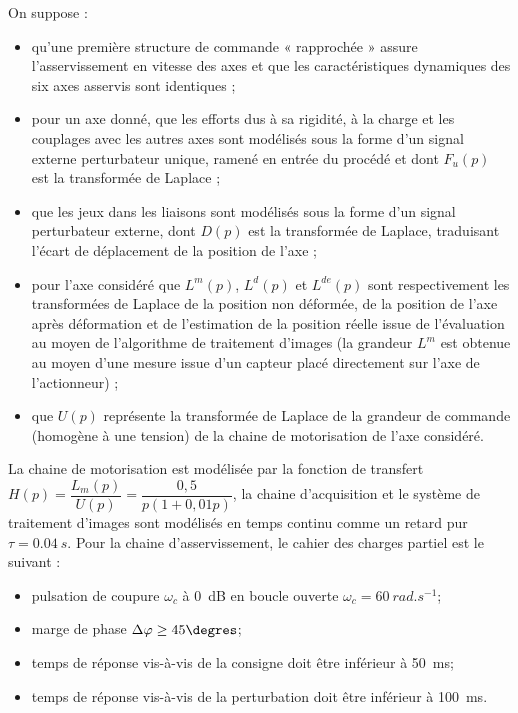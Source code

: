 \ifprof
\else
\ifcolle
\else
On suppose :
\begin{itemize}
\item qu’une première structure de commande « rapprochée » assure l’asservissement en vitesse des axes et que les caractéristiques dynamiques des six axes asservis sont identiques ;
\item pour un axe donné, que les efforts dus à sa rigidité, à la charge et les couplages avec les autres axes sont modélisés sous la forme d’un signal externe perturbateur unique, ramené en entrée du procédé et dont $F_u(p)$ est la transformée de Laplace ;
\item que les jeux dans les liaisons sont modélisés sous la forme d’un signal perturbateur externe, dont $D(p)$ est la transformée de Laplace, traduisant l’écart de déplacement de la position de l’axe ;
\item pour l’axe considéré que $L^m(p)$, $L^d(p)$ et $L^{de}(p)$ sont respectivement les transformées de Laplace de la position non déformée, de la position de l’axe après déformation et de l’estimation de la position réelle issue de l’évaluation au moyen de l’algorithme de traitement d’images (la grandeur $L^m$ est obtenue au moyen d’une mesure issue d’un capteur placé directement sur l’axe de l’actionneur) ;
\item que $U(p)$ représente la transformée de Laplace de la grandeur de commande (homogène à une tension) de la chaine de motorisation de l’axe considéré.
\end{itemize}
\fi


La chaine de motorisation est modélisée par la fonction de transfert $H(p)=\dfrac{L_m(p)}{U(p)}=\dfrac{0,5}{p\left( 1+0,01 p\right)}$, la chaine d'acquisition et le système de traitement d’images sont modélisés en temps continu comme un retard pur $\tau=\SI{0,04}{s}$.
Pour la chaine d’asservissement, le cahier des charges partiel est le suivant :
\begin{itemize}
\item pulsation de coupure $\omega_c$ à \SI{0}{dB} en boucle ouverte $\omega_c = \SI{60}{rad.s^{-1}}$;
\item marge de phase $\Delta \varphi \geq 45 \degres$;
\item temps de réponse vis-à-vis de la consigne doit être inférieur à \SI{50}{ms}; 
\item temps de réponse vis-à-vis de la perturbation doit être inférieur à \SI{100}{ms}.
\end{itemize}


